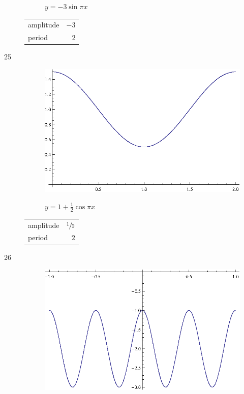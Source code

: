 \documentclass{exam}
\begin{document}
\begin{description}
\begin{figure}[H]
          $y = -3 \sin \pi x$
        \end{figure}

        \begin{tabular}[H]{lr}
          \toprule
          amplitude & $-3$ \\
          period    & $2$ \\
          \bottomrule
        \end{tabular}

      \item[25]
        \begin{figure}[H]
          \centering
          \includegraphics[scale=0.9]{exercise25.eps}

          $y = 1 + \frac{1}{2} \cos \pi x$
        \end{figure}

        \begin{tabular}[H]{lr}
          \toprule
          amplitude & $\sfrac{1}{2}$ \\
          period    & $2$ \\
          \bottomrule
        \end{tabular}

      \item[26]
        \begin{figure}[H]
          \centering
          \includegraphics[scale=0.9]{exercise26.eps}


\end{figure}
\end{description}
\end{document}
